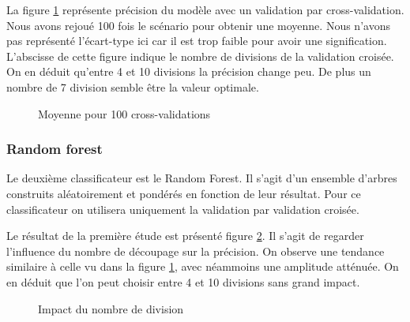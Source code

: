 \documentclass[11pt,a4paper]{article}
\begin{document}
			La figure \ref{cv_dt} représente précision du modèle avec un validation par cross-validation. Nous avons rejoué 100 fois le scénario pour obtenir une moyenne. Nous n'avons pas représenté l'écart-type ici car il est trop faible pour avoir une signification. L'abscisse de cette figure indique le nombre de divisions de la validation croisée.
			On en déduit qu'entre 4 et 10 divisions la précision change peu. De plus un nombre de 7 division semble être la valeur optimale.

			\begin{figure}
				\caption{Moyenne pour 100 cross-validations}
				\label{cv_dt}
			\end{figure}


		\subsubsection{Random forest}
		
			Le deuxième classificateur est le Random Forest. Il s'agit d'un ensemble d'arbres construits aléatoirement et pondérés en fonction de leur résultat. Pour ce classificateur on utilisera uniquement la validation par validation croisée.

			Le résultat de la première étude est présenté figure \ref{random_forest}. Il s'agit de regarder l'influence du nombre de découpage sur la précision. On observe une tendance similaire à celle vu dans la figure \ref{cv_dt}, avec néammoins une amplitude atténuée. On en déduit que l'on peut choisir entre 4 et 10 divisions sans grand impact.


			\begin{figure}
				\caption{Impact du nombre de division}
				\label{random_forest}
			\end{figure}
\end{document}

